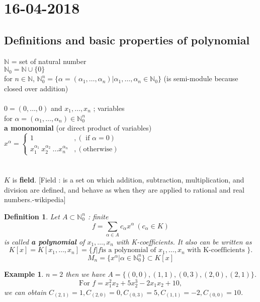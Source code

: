 \documentclass[a4paper,10pt]{article}
\newtheorem{defi}{Definition}
\newtheorem{ex}{Example}
\begin{document}
\section{16-04-2018}

\subsection{Definitions and basic properties of polynomial}
$ \mathbb{N} $ = set of natural number\\
$ \mathbb{N}_{0}  = \mathbb{N} \cup \{0\}$\\
for $ n \in \mathbb{N} $, $ \mathbb{N}_{0}^{n} = \{ \alpha=(\alpha_{1}, \dots, \alpha_{n}) | \alpha_{1}, \dots, \alpha_{n} \in \mathbb{N}_{0} \} $ (is semi-module because closed over addition) \\ \\
$ 0 = (0, \dots, 0) $ and $ x_{1}, \dots, x_{n} $ ; variables\\
for $ \alpha=(\alpha_{1}, \dots, \alpha_{n}) \in \mathbb{N}_{0}^{n} $\\
\textbf{a mononomial} (or direct product of variables) $ x^{\alpha} = \begin{cases}
1 &, (\text{ if } \alpha=0) \\ x_{1}^{\alpha_{1}} \ x_{2}^{\alpha_{2}} \ \dots x_{n}^{\alpha_{n}} &, (\text{otherwise})
\end{cases} $ \\ \\ \\
$ K $ is \textbf{field}. [Field : is a set on which addition, subtraction, multiplication, and division are defined, and behave as when they are applied to rational and real numbers.-wikipedia]

\begin{defi}
	Let $ A \subset \mathbb{N}_{0}^{n} $ : finite
	\[ f = \sum_{\alpha \in A} c_{\alpha} x^{\alpha} \ (c_{\alpha} \in K) \]
	is called \textbf{a polynomial} of $ x_{1}, \dots, x_{n} $ with K-coefficients. It also can be written as
	\[ K[x] = K [x_{1}, \dots, x_{n}]  = \{ f | f \text{is a polynomial of } x_{1}, \dots, x_{n}  \text{ with K-coefficients }\}. \]
	\[M_{n} = \{ x^{\alpha} | \alpha \in \mathbb{N}_{0}^{n} \} \subset K[x] \]
\end{defi}

\begin{ex}
	$ n=2 $ then we have $ A =\{ (0,0), (1,1), (0,3), (2,0), (2,1) \} $. 
	\[ \text{For } f = x_{1}^2 x_{2} + 5x_{2}^3 -2x_{1}x_{2} + 10 , \]
	we can obtain $ C_{(2,1)} =1 , C_{(2,0)}=0, C_{(0,3)}=5, C_{(1,1)}=-2, C_{(0,0)}=10 $.
\end{ex}
\end{document}
